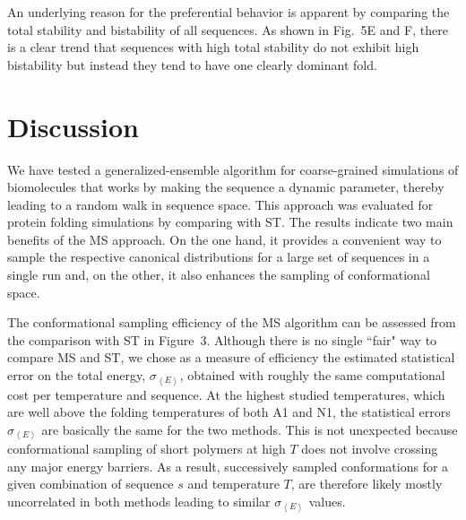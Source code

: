 \documentclass[%
 aip,
rsi,%
 amsmath,amssymb,
 reprint,%
]{revtex4-1}
\newcommand	 {\sbar}	{{s}}
\newcommand {\Pcut}     	{{P_\mathrm{cut}}}
\newcommand {\sigE}	{{\sigma_{\left < E \right >}}}
\begin{document}
An underlying reason for the preferential behavior is apparent by comparing the total stability and bistability of all sequences. As shown in Fig.~5E and F, there is a clear trend that sequences with high total stability do not exhibit high bistability but instead they tend to have one clearly dominant fold.\\

%
%
 
\section{Discussion}
\noindent
We have tested a generalized-ensemble algorithm for coarse-grained simulations of biomolecules that works by making the sequence a dynamic parameter, thereby leading to a random walk in sequence space. This approach was evaluated for protein folding simulations by comparing with ST. The results indicate two main benefits of the MS approach. On the one hand, it provides a convenient way to sample the respective canonical distributions for a large set of sequences in a single run and, on the other, it also enhances the sampling of conformational space. 

The conformational sampling efficiency of the MS algorithm can be assessed from the comparison with ST in Figure~3. Although there is no single ``fair" way to compare MS and ST, we chose as a measure of efficiency the estimated statistical error on the total energy, $\sigE$, obtained with roughly the same computational cost per temperature and sequence. At the highest studied temperatures, which are well above the folding temperatures of both A1 and N1, the statistical errors $\sigE$ are basically the same for the two methods. This is not unexpected because conformational sampling of short polymers at high $T$ does not involve crossing any major energy barriers. As a result, successively sampled conformations for a given combination of sequence $\sbar$ and temperature $T$, are therefore likely mostly uncorrelated in both methods leading to similar $\sigE$ values. 
\end{document}
